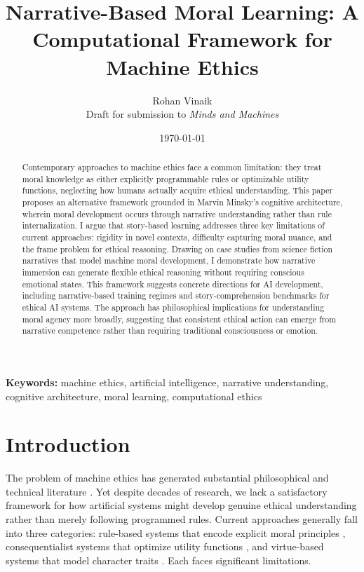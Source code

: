 \documentclass[12pt]{article}
\title{Narrative-Based Moral Learning: A Computational Framework for Machine Ethics}
\author{Rohan Vinaik\\
\small Draft for submission to \textit{Minds and Machines}}
\date{\today}
\begin{document}
\maketitle

\begin{abstract}
Contemporary approaches to machine ethics face a common limitation: they treat moral knowledge as either explicitly programmable rules or optimizable utility functions, neglecting how humans actually acquire ethical understanding. This paper proposes an alternative framework grounded in Marvin Minsky's cognitive architecture, wherein moral development occurs through narrative understanding rather than rule internalization. I argue that story-based learning addresses three key limitations of current approaches: rigidity in novel contexts, difficulty capturing moral nuance, and the frame problem for ethical reasoning. Drawing on case studies from science fiction narratives that model machine moral development, I demonstrate how narrative immersion can generate flexible ethical reasoning without requiring conscious emotional states. This framework suggests concrete directions for AI development, including narrative-based training regimes and story-comprehension benchmarks for ethical AI systems. The approach has philosophical implications for understanding moral agency more broadly, suggesting that consistent ethical action can emerge from narrative competence rather than requiring traditional consciousness or emotion.
\end{abstract}

\noindent\textbf{Keywords:} machine ethics, artificial intelligence, narrative understanding, cognitive architecture, moral learning, computational ethics

\section{Introduction}

The problem of machine ethics has generated substantial philosophical and technical literature \citep{wallach2008moral, anderson2011machine, allen2005artificial}. Yet despite decades of research, we lack a satisfactory framework for how artificial systems might develop genuine ethical understanding rather than merely following programmed rules. Current approaches generally fall into three categories: rule-based systems that encode explicit moral principles \citep{gips1995towards, anderson2008geneth}, consequentialist systems that optimize utility functions \citep{abel2016reinforcement}, and virtue-based systems that model character traits \citep{howard2001computational, vallor2016technology}. Each faces significant limitations.
\end{document}
